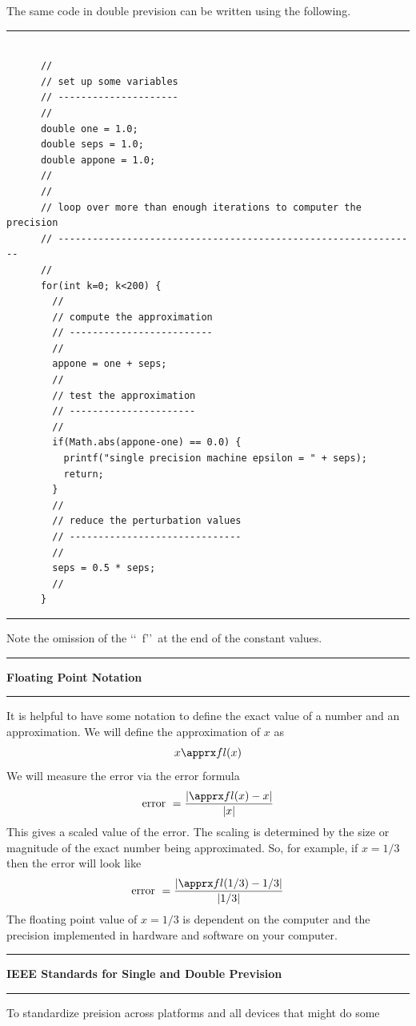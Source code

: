 \documentclass[10pt,fleqn]{article}
\begin{document}
The same code in double prevision can be written using the following.
\vskip0.1in\hrule\vskip0.1in \noindent
\begin{verbatim}

      //
      // set up some variables
      // ---------------------
      //
      double one = 1.0;
      double seps = 1.0;
      double appone = 1.0;
      //
      //
      // loop over more than enough iterations to computer the precision
      // ---------------------------------------------------------------
      //
      for(int k=0; k<200) {
        //
        // compute the approximation
        // -------------------------
        //
        appone = one + seps;
        //
        // test the approximation
        // ----------------------
        //
        if(Math.abs(appone-one) == 0.0) {
          printf("single precision machine epsilon = " + seps);
          return;
        }
        //
        // reduce the perturbation values
        // ------------------------------
        //
        seps = 0.5 * seps;
        //
      }

\end{verbatim}
\vskip0.1in\hrule\vskip0.1in \noindent
Note the omission of the \lq\lq\ f\rq\rq\ at the end of the constant values.
\vskip0.1in\hrule\vskip0.1in \noindent
{\bf Floating Point Notation} 
\vskip0.1in\hrule\vskip0.1in \noindent
It is helpful to have some notation to define the exact value of a number and an
approximation. We will define the approximation of \(x\) as
\[
  x \apprx fl(x)
\]
We will measure the error via the error formula
\[
  \makebox{error } =  {{ | \apprx fl(x) - x | }\over{ | x | }}
\]
This gives a scaled value of the error. The scaling is determined by the size or
magnitude of the exact number being approximated. So, for example, if \(x=1/3\)
then the error will look like
\[
  \makebox{error } =  {{ | \apprx fl(1/3) - 1/3 | }\over{ | 1/3 | }}
\]
The floating point value of \(x=1/3\) is dependent on the computer and the
precision implemented in hardware and software on your computer.
\vskip0.1in\hrule\vskip0.1in \noindent
{\bf IEEE Standards for Single and Double Prevision} 
\vskip0.1in\hrule\vskip0.1in \noindent
To standardize preision across platforms and all devices that might do some
\end{document}
